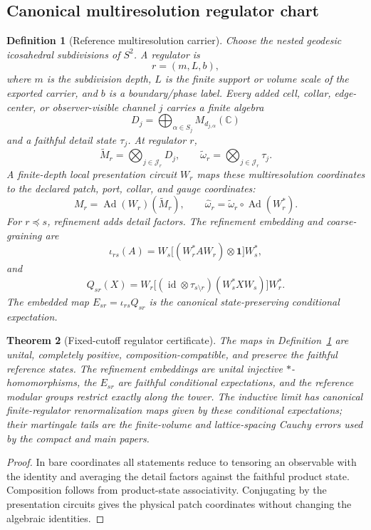 \documentclass[11pt]{article}
\newtheorem{theorem}{Theorem}[section]
\newtheorem{definition}[theorem]{Definition}
\theoremstyle{remark}
\theoremstyle{plain}
\begin{document}
\subsection{Canonical multiresolution regulator chart}

\begin{definition}[Reference multiresolution carrier]\label{def:microphysics-multiresolution-carrier}
Choose the nested geodesic icosahedral subdivisions of \(S^2\). A regulator is
\[
r=(m,L,b),
\]
where \(m\) is the subdivision depth, \(L\) is the finite support or volume scale of the exported
carrier, and \(b\) is a boundary/phase label. Every added cell, collar, edge-center, or
observer-visible channel \(j\) carries a finite algebra
\[
D_j=\bigoplus_{\alpha\in S_j}M_{d_{j,\alpha}}(\mathbb C)
\]
and a faithful detail state \(\tau_j\). At regulator \(r\),
\[
\widetilde M_r=\bigotimes_{j\in\mathcal J_r}D_j,\qquad
\widetilde\omega_r=\bigotimes_{j\in\mathcal J_r}\tau_j .
\]
A finite-depth local presentation circuit \(W_r\) maps these multiresolution coordinates to the
declared patch, port, collar, and gauge coordinates:
\[
M_r=\operatorname{Ad}(W_r)(\widetilde M_r),\qquad
\widehat\omega_r=\widetilde\omega_r\circ\operatorname{Ad}(W_r^*).
\]
For \(r\preceq s\), refinement adds detail factors. The refinement embedding and coarse-graining
are
\[
\iota_{rs}(A)=W_s\bigl[(W_r^*AW_r)\otimes\mathbf1\bigr]W_s^*,
\]
and
\[
Q_{sr}(X)=W_r\bigl[(\operatorname{id}\otimes\tau_{s\setminus r})
(W_s^*XW_s)\bigr]W_r^* .
\]
The embedded map \(E_{sr}=\iota_{rs}Q_{sr}\) is the canonical state-preserving conditional
expectation.
\end{definition}

\begin{theorem}[Fixed-cutoff regulator certificate]\label{thm:microphysics-regulator-certificate}
The maps in Definition~\ref{def:microphysics-multiresolution-carrier} are unital, completely
positive, composition-compatible, and preserve the faithful reference states. The refinement
embeddings are unital injective \(*\)-homomorphisms, the \(E_{sr}\) are faithful conditional
expectations, and the reference modular groups restrict exactly along the tower. The inductive
limit has canonical finite-regulator renormalization maps given by these conditional
expectations; their martingale tails are the finite-volume and lattice-spacing Cauchy errors used
by the compact and main papers.
\end{theorem}

\begin{proof}
In bare coordinates all statements reduce to tensoring an observable with the identity and
averaging the detail factors against the faithful product state. Composition follows from
product-state associativity. Conjugating by the presentation circuits gives the physical patch
coordinates without changing the algebraic identities.
\end{proof}
\end{document}
